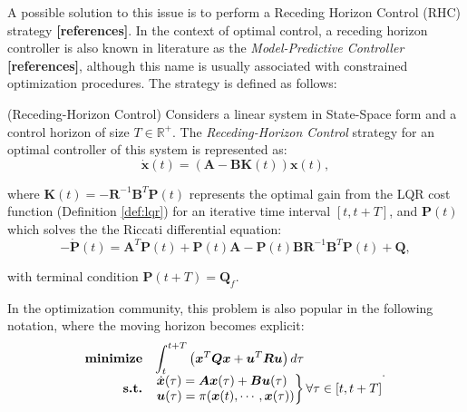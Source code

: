 \documentclass[a4paper,11pt]{book}
\numberwithin{figure}{chapter}
\numberwithin{equation}{chapter}
\numberwithin{table}{chapter}
\theoremstyle{definition}
\newtheorem{definition}{Definition}[chapter]
\newcounter{boxed-theorem}
\newcounter{boxed-definition}
\newenvironment{boxed-definition}[1]
{\begin{shaded} \begin{definition}{#1}}
{\end{definition} \end{shaded}}
\begin{document}
A possible solution to this issue is to perform a Receding Horizon Control (RHC) strategy \textbf{[references]}. In the context of optimal control, a receding horizon controller is also known in literature as the \textit{Model-Predictive Controller} \textbf{[references]}, although this name is usually associated with constrained optimization procedures. The strategy is defined as follows:

\begin{boxed-definition}{(Receding-Horizon Control)} \label{def:recedingHorizon}
	Considers a linear system in State-Space form and a control horizon of size $T \in \mathbb{R}^+$. The \textit{Receding-Horizon Control} strategy for an optimal controller of this system is represented as:
	\begin{equation}
        \dot{\bm{x}}(t) = \left( \bm{A} - \bm{B} \bm{K}(t) \right) \bm{x}(t)
    ,\end{equation} 
    
	\noindent where $\bm{K}(t) = - \bm{R}^{-1} \bm{B}^T \bm{P}(t)$ represents the optimal gain from the LQR cost function (Definition \ref{def:lqr}) for an iterative time interval $[t, t+T]$, and $\bm{P}(t)$ which solves the the Riccati differential equation:
    \begin{equation}
        -\dot{\bm{P}}(t) = \bm{A}^T \bm{P}(t) + \bm{P}(t) \bm{A} - \bm{P}(t) \bm{B} \bm{R}^{-1} \bm{B}^T \bm{P}(t) + \bm{Q}
    ,\end{equation}
    
    \noindent with terminal condition $\bm{P}(t+T) = \bm{Q}_f$.
\end{boxed-definition}

In the optimization community, this problem is also popular in the following notation, where the moving horizon becomes explicit:
\begin{align}
\begin{matrix*}[l]
    \textbf{minimize} & {\displaystyle \int_{t}^{t+T}  \left( \bm{x}^T \bm{Q} \bm{x} + \bm{u}^T \bm{R} \bm{u} \right) d\tau } \\
    \hfill \textbf{s.t.} & \left. \begin{matrix*}[l] 
    	\dot{\bm{x}}(\tau) = \bm{A}\bm{x}(\tau) + \bm{B}\bm{u}(\tau)  \\ 
    	\bm{u}(\tau) = \pi(\bm{x}(t), \cdots, \bm{x}(\tau))
    \end{matrix*} \right\} \forall \tau \in [t, t+T]
\end{matrix*}
.\end{align}
\end{document}
